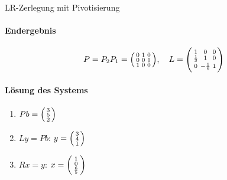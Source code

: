 \begin{example2}{LR-Zerlegung mit Pivotisierung}
\paragraph{Endergebnis}
$$P = P_2P_1 = \begin{psmallmatrix}
0 & 1 & 0\\
0 & 0 & 1\\
1 & 0 & 0
\end{psmallmatrix}, \quad
L = \begin{psmallmatrix}
1 & 0 & 0\\
\frac{1}{3} & 1 & 0\\
0 & -\frac{1}{6} & 1
\end{psmallmatrix}$$

\paragraph{Lösung des Systems}
\begin{enumerate}
    \item $Pb = \begin{psmallmatrix} 3\\ 5\\ 2 \end{psmallmatrix}$
    \item $Ly = Pb$: $y = \begin{psmallmatrix} 3\\ 4\\ 1 \end{psmallmatrix}$
    \item $Rx = y$: $x = \begin{psmallmatrix} 1\\ 0\\ \frac{6}{5} \end{psmallmatrix}$
\end{enumerate}
\end{example2}

